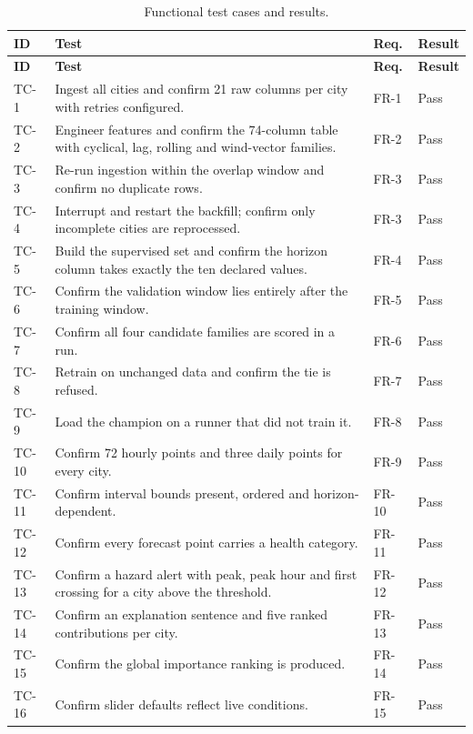 \begin{xltabular}{\textwidth}{Q{1.3cm} P{4.4cm} Q{1.5cm} Y}
\caption{Functional test cases and results.}\label{tab:testcases}\\
\toprule
\bfseries ID & \bfseries Test & \bfseries Req. & \bfseries Result \\
\midrule
\endfirsthead
\toprule
\bfseries ID & \bfseries Test & \bfseries Req. & \bfseries Result \\
\midrule
\endhead
\bottomrule
\endlastfoot
TC-1 & Ingest all cities and confirm 21 raw columns per city with retries
configured. & FR-1 & Pass \\
TC-2 & Engineer features and confirm the 74-column table with cyclical, lag,
rolling and wind-vector families. & FR-2 & Pass \\
TC-3 & Re-run ingestion within the overlap window and confirm no duplicate
rows. & FR-3 & Pass \\
TC-4 & Interrupt and restart the backfill; confirm only incomplete cities are
reprocessed. & FR-3 & Pass \\
TC-5 & Build the supervised set and confirm the horizon column takes exactly the
ten declared values. & FR-4 & Pass \\
TC-6 & Confirm the validation window lies entirely after the training window. &
FR-5 & Pass \\
TC-7 & Confirm all four candidate families are scored in a run. & FR-6 & Pass \\
TC-8 & Retrain on unchanged data and confirm the tie is refused. & FR-7 &
Pass \\
TC-9 & Load the champion on a runner that did not train it. & FR-8 & Pass \\
TC-10 & Confirm 72 hourly points and three daily points for every city. & FR-9 &
Pass \\
TC-11 & Confirm interval bounds present, ordered and horizon-dependent. & FR-10 &
Pass \\
TC-12 & Confirm every forecast point carries a health category. & FR-11 & Pass \\
TC-13 & Confirm a hazard alert with peak, peak hour and first crossing for a city
above the threshold. & FR-12 & Pass \\
TC-14 & Confirm an explanation sentence and five ranked contributions per city. &
FR-13 & Pass \\
TC-15 & Confirm the global importance ranking is produced. & FR-14 & Pass \\
TC-16 & Confirm slider defaults reflect live conditions. & FR-15 & Pass \\

\end{xltabular}
